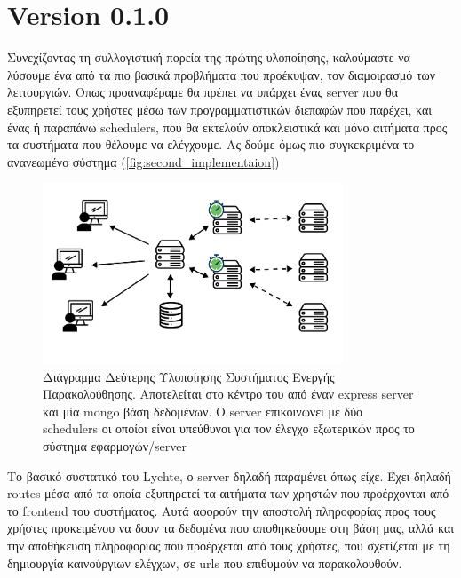 \newpage

\section{Version 0.1.0}
\label{section:second_implementation}

Συνεχίζοντας τη συλλογιστική πορεία της πρώτης υλοποίησης, καλούμαστε να λύσουμε ένα από τα πιο βασικά προβλήματα που προέκυψαν,
τον διαμοιρασμό των λειτουργιών. Όπως προαναφέραμε θα πρέπει να υπάρχει ένας server που θα εξυπηρετεί
τους χρήστες μέσω των προγραμματιστικών διεπαφών που παρέχει, και ένας ή παραπάνω schedulers, που θα εκτελούν
αποκλειστικά και μόνο αιτήματα προς τα συστήματα που θέλουμε να ελέγχουμε. Ας δούμε όμως πιο συγκεκριμένα το ανανεωμένο σύστημα (\autoref{fig:second_implementaion})

\begin{figure}[!ht]
	\centering
	\includegraphics[width=0.8\textwidth]{./images/chapter4/lychte-second-implementation.png}
	\caption[Διάγραμμα δεύτερης Υλοποίησης]{Διάγραμμα Δεύτερης Υλοποίησης Συστήματος Ενεργής Παρακολούθησης. Αποτελείται στο κέντρο του από έναν express server και μία mongo βάση δεδομένων. Ο server επικοινωνεί με δύο schedulers οι οποίοι είναι υπεύθυνοι για τον έλεγχο εξωτερικών προς το σύστημα εφαρμογών/server}
	\label{fig:second_implementaion}
\end{figure}

Το βασικό συστατικό του Lychte, ο server δηλαδή παραμένει όπως είχε. Έχει δηλαδή routes μέσα από τα οποία εξυπηρετεί τα αιτήματα
των χρηστών που προέρχονται από το frontend του συστήματος. Αυτά αφορούν την αποστολή πληροφορίας προς τους χρήστες προκειμένου να δουν
τα δεδομένα που αποθηκεύουμε στη βάση μας, αλλά και την αποθήκευση πληροφορίας που προέρχεται από τους χρήστες, που σχετίζεται με τη δημιουργία
καινούργιων ελέγχων, σε urls που επιθυμούν να παρακολουθούν.

